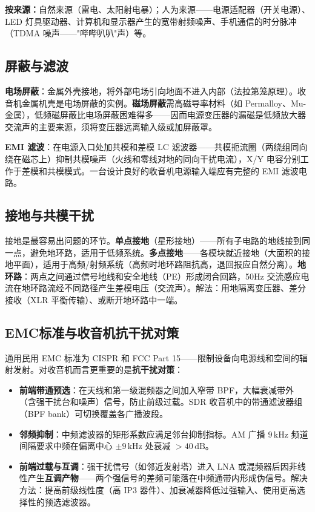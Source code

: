 \documentclass[12pt,UTF8]{ctexbook}
\begin{document}
\textbf{按来源：}自然来源（雷电、太阳射电暴）；人为来源——电源适配器（开关电源）、LED 灯具驱动器、计算机和显示器产生的宽带射频噪声、手机通信的时分脉冲（TDMA 噪声——"哔哔叭叭"声）等。

\subsection{屏蔽与滤波}

\textbf{电场屏蔽}：金属外壳接地，将外部电场引向地面不进入内部（法拉第笼原理）。收音机金属机壳是电场屏蔽的实例。\textbf{磁场屏蔽}需高磁导率材料（如 Permalloy、Mu-金属），低频磁屏蔽比电场屏蔽困难得多——因而电源变压器的漏磁是低频放大器交流声的主要来源，须将变压器远离输入级或加屏蔽罩。

\textbf{EMI 滤波}：在电源入口处加共模和差模 LC 滤波器——共模扼流圈（两绕组同向绕在磁芯上）抑制共模噪声（火线和零线对地的同向干扰电流），X/Y 电容分别工作于差模和共模模式。一台设计良好的收音机电源输入端应有完整的 EMI 滤波电路。

\subsection{接地与共模干扰}

接地是最容易出问题的环节。\textbf{单点接地}（星形接地）——所有子电路的地线接到同一点，避免地环路，适用于低频系统。\textbf{多点接地}——各模块就近接地（大面积的接地平面），适用于高频/射频系统（高频时地环路阻抗高，退回报应自然分离）。\textbf{地环路}：两点之间通过信号地线和安全地线（PE）形成闭合回路，50Hz 交流感应电流在地环路流经不同路径产生差模电压（交流声）。解法：用地隔离变压器、差分接收（XLR 平衡传输）、或断开地环路中一端。

\subsection{EMC标准与收音机抗干扰对策}

通用民用 EMC 标准为 CISPR 和 FCC Part 15——限制设备向电源线和空间的辐射发射。对收音机而言更重要的是\textbf{抗干扰对策}：
\begin{itemize}
  \item \textbf{前端带通预选}：在天线和第一级混频器之间加入窄带 BPF，大幅衰减带外（含强干扰台和噪声）信号，防止前级过载。SDR 收音机中的带通滤波器组（BPF bank）可切换覆盖各广播波段。
  \item \textbf{邻频抑制}：中频滤波器的矩形系数应满足邻台抑制指标。AM 广播 $9\,\mathrm{kHz}$ 频道间隔要求中频在偏离中心 $\pm9\,\mathrm{kHz}$ 处衰减 $>40\,\mathrm{dB}$。
  \item \textbf{前端过载与互调}：强干扰信号（如邻近发射塔）进入 LNA 或混频器后因非线性产生\textbf{互调产物}——两个强信号的差频可能落在中频通带内形成伪信号。解决方法：提高前级线性度（高 IP3 器件）、加衰减器降低过强输入、使用更高选择性的预选滤波器。
\end{itemize}
\end{document}
